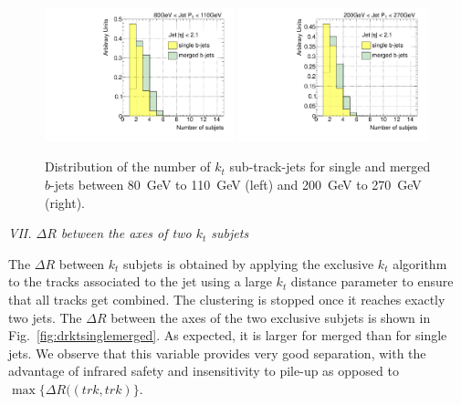 \begin{figure}[tp]
\centering
\includegraphics[width=0.49\textwidth]{FIGS/VarsSingleMerged/Nsubjets080.pdf}
\includegraphics[width=0.49\textwidth]{FIGS/VarsSingleMerged/Nsubjets200.pdf}
\caption{Distribution of the number of $k_t$ sub-track-jets for single and merged $b$-jets between 80~GeV to 110~GeV (left) and 200~GeV to 270~GeV (right).}
\label{fig:nsubjetsinglemerged}
\end{figure}


{ \em VII. $\Delta R$ between the axes of two $k_t$ subjets}
\vspace{3 mm}

The $\Delta R$ between $k_t$ subjets is obtained by applying the exclusive $k_t$ algorithm~\cite{exclusivekt} to the tracks associated to the jet using a large $k_t$ distance parameter to ensure that all tracks get combined. The clustering is stopped once it reaches exactly two jets. The $\Delta R$ between the axes of the two exclusive subjets is shown in Fig.~\ref{fig:drktsinglemerged}.  As expected, it is larger for merged than for single jets. We observe that this
variable provides very good separation, with the advantage of infrared safety and insensitivity to pile-up as opposed to $\max\{\Delta R((trk,trk)\}$.
\vspace{3 mm}

